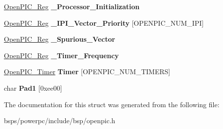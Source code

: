 \begin{DoxyCompactItemize}
\mbox{\hyperlink{struct__OpenPIC__Reg}{Open\+P\+I\+C\+\_\+\+Reg}} {\bfseries \+\_\+\+Processor\+\_\+\+Initialization}
\item 
\mbox{\label{struct__OpenPIC__Global_a9a5816d0aa57893329268fb30ff9e77a}} 
\mbox{\hyperlink{struct__OpenPIC__Reg}{Open\+P\+I\+C\+\_\+\+Reg}} {\bfseries \+\_\+\+I\+P\+I\+\_\+\+Vector\+\_\+\+Priority} \mbox{[}O\+P\+E\+N\+P\+I\+C\+\_\+\+N\+U\+M\+\_\+\+I\+PI\mbox{]}
\item 
\mbox{\label{struct__OpenPIC__Global_a9900ec2d65f5615befea3d885fa4d464}} 
\mbox{\hyperlink{struct__OpenPIC__Reg}{Open\+P\+I\+C\+\_\+\+Reg}} {\bfseries \+\_\+\+Spurious\+\_\+\+Vector}
\item 
\mbox{\label{struct__OpenPIC__Global_a74d231ea6502d0dd79ab41368f4db149}} 
\mbox{\hyperlink{struct__OpenPIC__Reg}{Open\+P\+I\+C\+\_\+\+Reg}} {\bfseries \+\_\+\+Timer\+\_\+\+Frequency}
\item 
\mbox{\label{struct__OpenPIC__Global_ac2b3a86d6d2a0f65d729730cb1aa107b}} 
\mbox{\hyperlink{struct__OpenPIC__Timer}{Open\+P\+I\+C\+\_\+\+Timer}} {\bfseries Timer} \mbox{[}O\+P\+E\+N\+P\+I\+C\+\_\+\+N\+U\+M\+\_\+\+T\+I\+M\+E\+RS\mbox{]}
\item 
\mbox{\label{struct__OpenPIC__Global_ac1167f322801e57a5932890cb709df73}} 
char {\bfseries Pad1} \mbox{[}0xee00\mbox{]}
\end{DoxyCompactItemize}


The documentation for this struct was generated from the following file\+:\begin{DoxyCompactItemize}
\item 
bsps/powerpc/include/bsp/openpic.\+h\end{DoxyCompactItemize}
